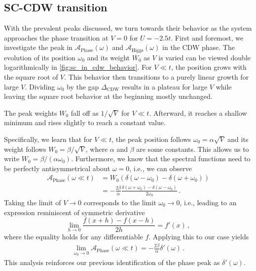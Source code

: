 \documentclass[
    reprint, 
    aps,
    preprintnumbers,
    twocolumn,
    prb,
    superscriptaddress
]{revtex4-2}
\newcommand{\spectral}[1]{\mathcal{A}_\text{#1}  (\omega)}
\begin{document}

\subsection{SC-CDW transition}

With the prevalent peaks discussed, we turn towards their behavior as the system approaches the phase transition at $V=0$ for $U=-2.5t$.
First and foremost, we investigate the peak in $\spectral{Phase}$ and $\spectral{Higgs}$ in the CDW phase.
The evolution of its position $\omega_0$ and its weight $W_0$ as $V$ is varied can be viewed double logarithmically in \autoref{fig:sc_in_cdw_behavior}.
For $V \ll t$, the position grows with the square root of $V$. This behavior then transitions to a purely linear growth for large $V$.
Dividing $\omega_0$ by the gap $\Delta_\text{CDW}$ results in a plateau for large $V$ while leaving the square root behavior at the beginning mostly unchanged.

The peak weights $W_0$ fall off as $1/\sqrt{V}$ for $V \ll t$. 
Afterward, it reaches a shallow minimum and rises slightly to reach a constant value.

Specifically, we learn that for $V \ll t$, the peak position follows $\omega_0 = \alpha \sqrt{V}$ and its weight follows $W_0 = \beta / \sqrt{V}$, 
where $\alpha$ and $\beta$ are some constants.
This allows us to write $W_0 = \beta / (\alpha \omega_0)$. 
Furthermore, we know that the spectral functions need to be perfectly antisymmetrical about $\omega = 0$, i.e., we can observe
\begin{align}
    \mathcal{A}_\text{Phase} (\omega \ll t) &= W_0 (\delta (\omega - \omega_0) - \delta (\omega + \omega_0)) \nonumber \\
        &= - \frac{2\beta}{\alpha} \frac{\delta (\omega + \omega_0) - \delta (\omega - \omega_0)}{2\omega_0} \,.
\end{align} 
Taking the limit of $V \to 0$ corresponds to the limit $\omega_0 \to 0$, i.e., leading to an expression reminiscent of symmetric derivative
\begin{equation}
    \lim_{h \to 0} \frac{f(x + h) - f(x - h)}{2h} = f'(x)\,,
\end{equation}
where the equality holds for any differentiable $f$.
Applying this to our case yields
\begin{align}
    \lim_{\omega_0 \to 0} \mathcal{A}_\text{Phase} (\omega \ll t) = - \frac{2 \beta}{\alpha} \delta'(\omega)\,.
\end{align}
This analysis reinforces our previous identification of the phase peak as $\delta' (\omega)$.
\end{document}
